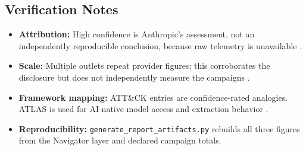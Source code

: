 \documentclass[11pt,a4paper]{article}
\begin{document}
\subsection*{Verification Notes}

\begin{itemize}[leftmargin=20pt, noitemsep]
    \item \textbf{Attribution:} High confidence is Anthropic's assessment, not an independently reproducible conclusion, because raw telemetry is unavailable \cite{anthropic_blog}.
    \item \textbf{Scale:} Multiple outlets repeat provider figures; this corroborates the disclosure but does not independently measure the campaigns \cite{anthropic_blog}\cite{techcrunch}\cite{reuters_alibaba}.
    \item \textbf{Framework mapping:} ATT\&CK entries are confidence-rated analogies. ATLAS is used for AI-native model access and extraction behavior \cite{mitre_attack}\cite{mitre_atlas}.
    \item \textbf{Reproducibility:} \texttt{generate\_report\_artifacts.py} rebuilds all three figures from the Navigator layer and declared campaign totals.
\end{itemize}
\end{document}
